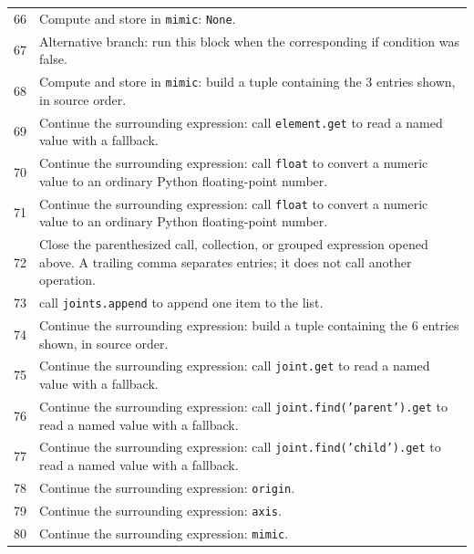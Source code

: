 \documentclass[11pt,a4paper]{book}
\begin{document}
\begin{longtable}{r p{}}
66 & Compute and store in \texttt{mimic}: \texttt{None}.  \\

67 & Alternative branch: run this block when the corresponding if condition was false. \\

68 & Compute and store in \texttt{mimic}: build a tuple containing the 3 entries shown, in source order.  \\

69 & Continue the surrounding expression: call \texttt{element.get} to read a named value with a fallback. \\

70 & Continue the surrounding expression: call \texttt{float} to convert a numeric value to an ordinary Python floating-point number. \\

71 & Continue the surrounding expression: call \texttt{float} to convert a numeric value to an ordinary Python floating-point number. \\

72 & Close the parenthesized call, collection, or grouped expression opened above. A trailing comma separates entries; it does not call another operation. \\

73 & call \texttt{joints.append} to append one item to the list. \\

74 & Continue the surrounding expression: build a tuple containing the 6 entries shown, in source order. \\

75 & Continue the surrounding expression: call \texttt{joint.get} to read a named value with a fallback. \\

76 & Continue the surrounding expression: call \texttt{joint.find('parent').get} to read a named value with a fallback. \\

77 & Continue the surrounding expression: call \texttt{joint.find('child').get} to read a named value with a fallback. \\

78 & Continue the surrounding expression: \texttt{origin}. \\

79 & Continue the surrounding expression: \texttt{axis}. \\

80 & Continue the surrounding expression: \texttt{mimic}. \\


\end{longtable}
\end{document}
